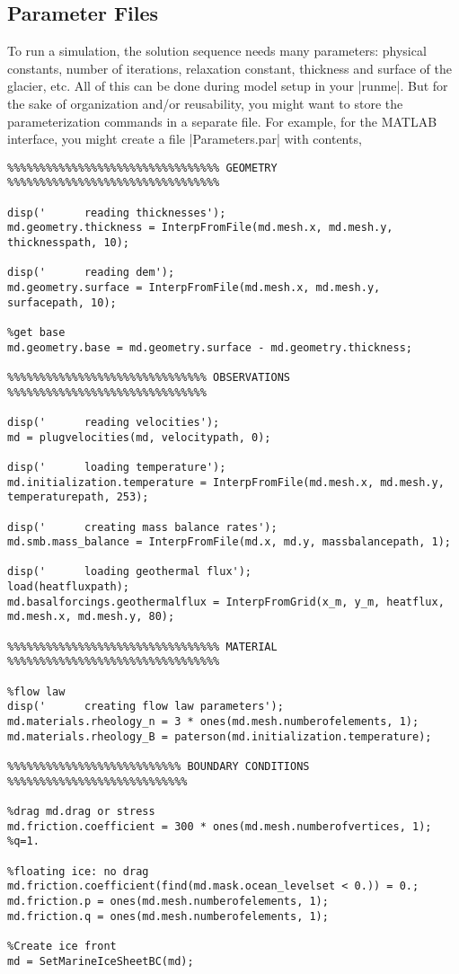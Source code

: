 
\subsection{Parameter Files} \label{sec:using-issm-parameterization-parameter-files}
To run a simulation, the solution sequence needs many parameters: physical constants, number of iterations, relaxation constant, thickness and surface of the glacier, etc. All of this can be done during model setup in your \lstinlinebg|runme|. But for the sake of organization and/or reusability, you might want to store the parameterization commands in a separate file. For example, for the MATLAB interface, you might create a file \lstinlinebg|Parameters.par| with contents,
\begin{lstlisting}
%%%%%%%%%%%%%%%%%%%%%%%%%%%%%%%%% GEOMETRY %%%%%%%%%%%%%%%%%%%%%%%%%%%%%%%%%

disp('      reading thicknesses');
md.geometry.thickness = InterpFromFile(md.mesh.x, md.mesh.y, thicknesspath, 10);

disp('      reading dem');
md.geometry.surface = InterpFromFile(md.mesh.x, md.mesh.y, surfacepath, 10);

%get base
md.geometry.base = md.geometry.surface - md.geometry.thickness;

%%%%%%%%%%%%%%%%%%%%%%%%%%%%%%% OBSERVATIONS %%%%%%%%%%%%%%%%%%%%%%%%%%%%%%%

disp('      reading velocities');
md = plugvelocities(md, velocitypath, 0);

disp('      loading temperature');
md.initialization.temperature = InterpFromFile(md.mesh.x, md.mesh.y, temperaturepath, 253);

disp('      creating mass balance rates');
md.smb.mass_balance = InterpFromFile(md.x, md.y, massbalancepath, 1);

disp('      loading geothermal flux'); 
load(heatfluxpath); 
md.basalforcings.geothermalflux = InterpFromGrid(x_m, y_m, heatflux, md.mesh.x, md.mesh.y, 80);

%%%%%%%%%%%%%%%%%%%%%%%%%%%%%%%%% MATERIAL %%%%%%%%%%%%%%%%%%%%%%%%%%%%%%%%%

%flow law 
disp('      creating flow law parameters');
md.materials.rheology_n = 3 * ones(md.mesh.numberofelements, 1);
md.materials.rheology_B = paterson(md.initialization.temperature);

%%%%%%%%%%%%%%%%%%%%%%%%%%% BOUNDARY CONDITIONS %%%%%%%%%%%%%%%%%%%%%%%%%%%%

%drag md.drag or stress
md.friction.coefficient = 300 * ones(md.mesh.numberofvertices, 1); %q=1.

%floating ice: no drag
md.friction.coefficient(find(md.mask.ocean_levelset < 0.)) = 0.;
md.friction.p = ones(md.mesh.numberofelements, 1);
md.friction.q = ones(md.mesh.numberofelements, 1);

%Create ice front
md = SetMarineIceSheetBC(md);
\end{lstlisting}

